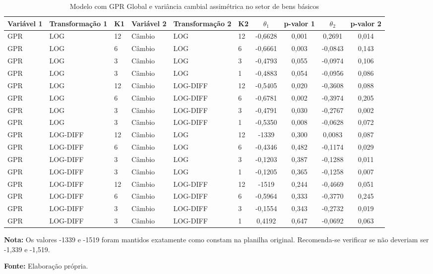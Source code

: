 \begin{table}[H]
\centering
\caption{Modelo com GPR Global e variância cambial assimétrica no setor de bens básicos}
\label{tab:modelo-gpr-cambio-bens-basicos}
\scriptsize
\begin{adjustbox}{max width=\textwidth}
\begin{tabular}{@{}llllllcccc@{}}
\toprule
Variável 1 & Transformação 1 & K1 & Variável 2 & Transformação 2 & K2 & $\theta_1$ & p-valor 1 & $\theta_2$ & p-valor 2 \\
\midrule
GPR & LOG & 12 & Câmbio & LOG & 12 & -0,6628 & 0,001 & 0,2691 & 0,014 \\
GPR & LOG & 6 & Câmbio & LOG & 6 & -0,6661 & 0,003 & -0,0843 & 0,143 \\
GPR & LOG & 3 & Câmbio & LOG & 3 & -0,4793 & 0,055 & -0,0974 & 0,106 \\
GPR & LOG & 3 & Câmbio & LOG & 1 & -0,4883 & 0,054 & -0,0956 & 0,086 \\
GPR & LOG & 12 & Câmbio & LOG-DIFF & 12 & -0,5405 & 0,020 & -0,3608 & 0,088 \\
GPR & LOG & 6 & Câmbio & LOG-DIFF & 6 & -0,6781 & 0,002 & -0,3974 & 0,205 \\
GPR & LOG & 3 & Câmbio & LOG-DIFF & 3 & -0,4791 & 0,030 & -0,2767 & 0,002 \\
GPR & LOG & 3 & Câmbio & LOG-DIFF & 1 & -0,5350 & 0,008 & -0,0628 & 0,072 \\
GPR & LOG-DIFF & 12 & Câmbio & LOG & 12 & -1339 & 0,300 & 0,0083 & 0,087 \\
GPR & LOG-DIFF & 6 & Câmbio & LOG & 6 & -0,4346 & 0,482 & -0,1174 & 0,029 \\
GPR & LOG-DIFF & 3 & Câmbio & LOG & 3 & -0,1203 & 0,387 & -0,1288 & 0,011 \\
GPR & LOG-DIFF & 3 & Câmbio & LOG & 1 & -0,1205 & 0,365 & -0,1258 & 0,007 \\
GPR & LOG-DIFF & 12 & Câmbio & LOG-DIFF & 12 & -1519 & 0,244 & -0,4669 & 0,051 \\
GPR & LOG-DIFF & 6 & Câmbio & LOG-DIFF & 6 & -0,5964 & 0,333 & -0,3770 & 0,245 \\
GPR & LOG-DIFF & 3 & Câmbio & LOG-DIFF & 3 & -0,1554 & 0,343 & -0,2732 & 0,019 \\
GPR & LOG-DIFF & 3 & Câmbio & LOG-DIFF & 1 & 0,4192 & 0,647 & -0,0692 & 0,063 \\
\bottomrule
\end{tabular}
\end{adjustbox}
\vspace{1mm}
\begin{minipage}{\textwidth}
\footnotesize
\textbf{Nota:} Os valores -1339 e -1519 foram mantidos exatamente como constam na planilha original. Recomenda-se verificar se não deveriam ser -1,339 e -1,519.\par
\textbf{Fonte:} Elaboração própria.
\end{minipage}
\end{table}
